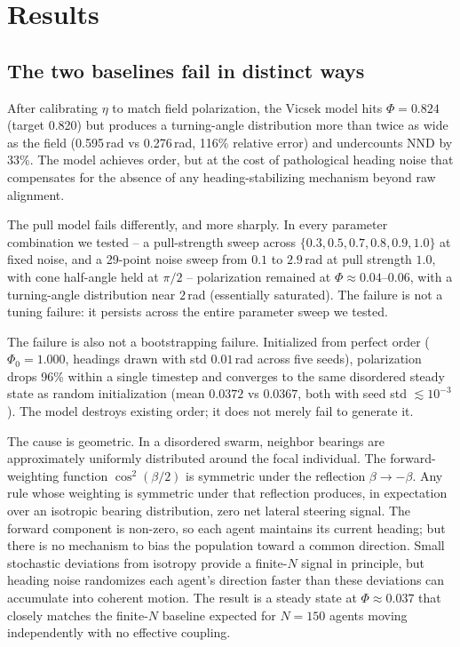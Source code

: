 \documentclass[11pt]{article}
\begin{document}
\section{Results}
\label{sec:results}

\subsection{The two baselines fail in distinct ways}

After calibrating $\eta$ to match field polarization, the Vicsek model
hits $\Phi = 0.824$ (target 0.820) but produces a turning-angle
distribution more than twice as wide as the field
(0.595\,rad vs 0.276\,rad, 116\% relative error) and undercounts NND by
33\%. The model achieves order, but at the cost of pathological
heading noise that compensates for the absence of any heading-stabilizing
mechanism beyond raw alignment.

The pull model fails differently, and more sharply. In every parameter
combination we tested -- a pull-strength sweep across $\{0.3, 0.5,
0.7, 0.8, 0.9, 1.0\}$ at fixed noise, and a 29-point noise sweep from
$0.1$ to $2.9\,$rad at pull strength $1.0$, with cone half-angle held
at $\pi/2$ -- polarization remained at $\Phi \approx 0.04$--$0.06$,
with a turning-angle distribution near $2\,$rad (essentially saturated).
The failure is not a tuning failure: it persists across the entire
parameter sweep we tested.

The failure is also not a bootstrapping failure. Initialized from
perfect order ($\Phi_0 = 1.000$, headings drawn with std $0.01\,$rad
across five seeds), polarization drops 96\% within a single timestep
and converges to the same disordered steady state as random
initialization (mean $0.0372$ vs $0.0367$, both with seed std $\lesssim
10^{-3}$). The model destroys existing order; it does not merely fail to
generate it.

The cause is geometric. In a disordered swarm, neighbor bearings are
approximately uniformly distributed around the focal individual. The
forward-weighting function $\cos^2(\beta/2)$ is symmetric under the
reflection $\beta \to -\beta$. Any rule whose weighting is symmetric
under that reflection produces, in expectation over an isotropic bearing
distribution, zero net lateral steering signal. The forward component
is non-zero, so each agent maintains its current heading; but there is
no mechanism to bias the population toward a common direction. Small
stochastic deviations from isotropy provide a finite-$N$ signal in
principle, but heading noise randomizes each agent's direction faster
than these deviations can accumulate into coherent motion. The result is
a steady state at $\Phi \approx 0.037$ that closely matches the
finite-$N$ baseline expected for $N=150$ agents moving independently
with no effective coupling.
\end{document}
